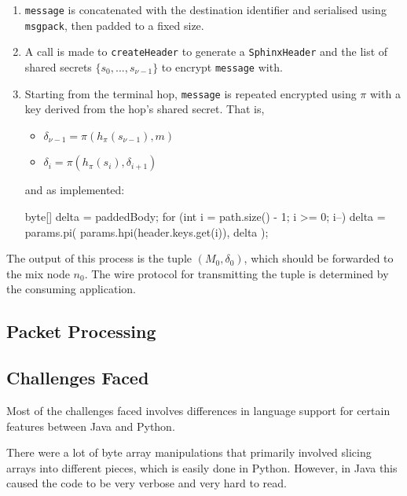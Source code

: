 \documentclass[final,dissertation.tex]{subfiles}
\begin{document}
\begin{enumerate}
	\item \verb|message| is concatenated with the destination identifier and serialised using \verb|msgpack|, then padded to a fixed size.
	\item A call is made to \verb|createHeader| to generate a \verb|SphinxHeader| and the list of shared secrets $\{s_0,...,s_{\nu-1}\}$ to encrypt \verb|message| with.
	\item Starting from the terminal hop, \verb|message| is repeated encrypted using $\pi$ with a key derived from the hop's shared secret. That is,
		\begin{itemize}
			\setlength\itemsep{-0em}
			\item $\delta_{\nu-1} = \pi(h_\pi(s_{\nu-1}), m)$
			\item $\delta_i = \pi(h_\pi(s_{i}), \delta_{i+1})$
		\end{itemize}
	and as implemented:
	\begin{javacode}
byte[] delta = paddedBody;
for (int i = path.size() - 1; i >= 0; i--) {
	delta = params.pi(
		params.hpi(header.keys.get(i)), 
		delta
	);
}
	\end{javacode}
\end{enumerate}

The output of this process is the tuple $(M_0, \delta_0)$, which should be forwarded to the mix node $n_0$. The wire protocol for transmitting the tuple is determined by the consuming application. 

%

\subsection{Packet Processing}

\subsection{Challenges Faced}

Most of the challenges faced involves differences in language support for certain features between Java and Python.

There were a lot of byte array manipulations that primarily involved slicing arrays into different pieces, which is easily done in Python. However, in Java this caused the code to be very verbose and very hard to read.
\end{document}
